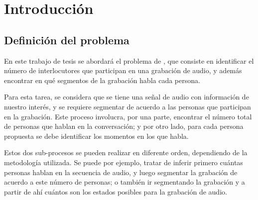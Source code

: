 
\chapter{Introducción}\label{ch:chap1}


\section{Definición del problema} 
\label{sec:definicion}
        
En este trabajo de tesis se abordará el problema de \SD, que consiste en identificar el número de interlocutores que participan en una grabación de audio, y además encontrar en qué segmentos de la grabación habla cada persona.

Para esta tarea, se considera que se tiene una señal de audio con información de nuestro interés, y se requiere segmentar de acuerdo a las personas que participan en la grabación. Este proceso involucra, por una parte, encontrar el número total de personas que hablan en la conversación; y por otro lado, para cada persona propuesta se debe identificar los momentos en los que habla.

Estos dos sub-procesos se pueden realizar en diferente orden, dependiendo de la metodología utilizada. Se puede por ejemplo, tratar de inferir primero cuántas personas hablan en la secuencia de audio, y luego segmentar la grabación de acuerdo a este número de personas; o también ir segmentando la grabación y a partir de ahí cuántos son los estados posibles para la grabación de audio.

